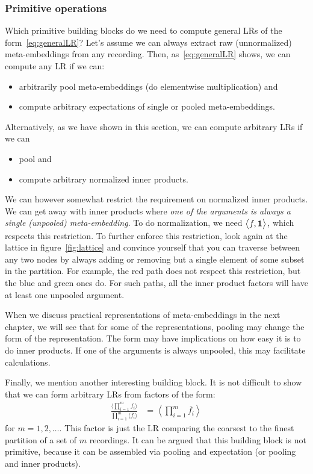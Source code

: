 \documentclass[a4paper,oneside,12pt,english]{report}
\def\expvb#1#2{\left\langle#1\right\rangle_{#2}}
\def\expv#1#2{\bigl\langle#1\bigr\rangle_{#2}}
\def\expp#1{\bigl\langle#1\bigr\rangle}
\def\dot#1#2{\expv{#1,#2}{}}
\def\normal#1{\overline{#1}}
\begin{document}
\subsubsection{Primitive operations}
Which primitive building blocks do we need to compute general LRs of the form~\eqref{eq:generalLR}? Let's assume we can always extract raw (unnormalized) meta-embeddings from any recording. Then, as~\eqref{eq:generalLR} shows, we can compute any LR if we can:
\begin{itemize}
	\item arbitrarily pool meta-embeddings (do elementwise multiplication) and
	\item compute arbitrary expectations of single or pooled meta-embeddings.
\end{itemize}
Alternatively, as we have shown in this section, we can compute arbitrary LRs if we can
\begin{itemize}
	\item pool and
	\item compute arbitrary normalized inner products.
\end{itemize}
We can however somewhat restrict the requirement on normalized inner products. We can get away with inner products where \emph{one of the arguments is always a single (unpooled) meta-embedding}. To do normalization, we need $\dot{f}{\onevec}$, which respects this restriction. To further enforce this restriction, look again at the lattice in figure~\ref{fig:lattice} and convince yourself that you can traverse between any two nodes by always adding or removing but a single element of some subset in the partition. For example, the red path does not respect this restriction, but the blue and green ones do. For such paths, all the inner product factors will have at least one unpooled argument.

When we discuss practical representations of meta-embeddings in the next chapter, we will see that for some of the representations, pooling may change the form of the representation. The form may have implications on how easy it is to do inner products. If one of the arguments is always unpooled, this may facilitate calculations.

Finally, we mention another interesting building block. It is not difficult to show that we can form arbitrary LRs from factors of the form:
\begin{align}
\frac{\expp{\prod_{i=1}^m f_i}}{\prod_{i=1}^m\expp{f_i}} &= \expvb{\prod_{i=1}^m \normal{f_i}}{}
\end{align}  
for $m=1,2,\ldots$. This factor is just the LR comparing the coarsest to the finest partition of a set of $m$ recordings. It can be argued that this building block is not primitive, because it can be assembled via pooling and expectation (or pooling and inner products).
\end{document}
